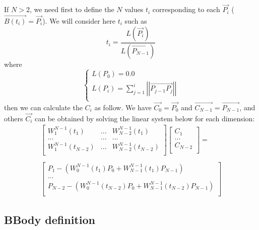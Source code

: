 If $N>2$, we need first to define the $N$ values $t_i$ corresponding to each $\overrightarrow{P_i}$ ($\overrightarrow{B(t_i)}=\overrightarrow{P_i}$). We will consider here $t_i$ such as\\
\begin{equation}
t_i=\frac{L(\overrightarrow{P_i})}{L(\overrightarrow{P_{N-1}})}
\end{equation}
where
\begin{equation}
\left\lbrace
\begin{array}{l}
L(P_0)=0.0\\
L(P_i)=\sum^i_{j=1}\left|\left|\overrightarrow{P_{j-1}P_j}\right|\right|\\
\end{array}
\right.
\end{equation}
then we can calculate the $C_i$ as follow. We have $\overrightarrow{C_0}=\overrightarrow{P_0}$ and $\overrightarrow{C_{N-1}}=\overrightarrow{P_{N-1}}$, and others $\overrightarrow{C_i}$ can be obtained by solving the linear system below for each dimension:\\
\begin{equation}
\begin{array}{c}
\left[
\begin{array}{ccc}
W^{N-1}_1(t_1)&...&W^{N-1}_{N-2}(t_1)\\
...&...&...\\
W^{N-1}_1(t_{N-2})&...&W^{N-1}_{N-2}(t_{N-2})\\
\end{array}
\right]\left[
\begin{array}{c}
C_1\\
...\\
C_{N-2}\\
\end{array}
\right]=\\
\\
\left[
\begin{array}{c}
P_1-\left(W^{N-1}_0(t_1)P_0+W^{N-1}_{N-1}(t_1)P_{N-1}\right)\\
...\\
P_{N-2}-\left(W^{N-1}_0(t_{N-2})P_0+W^{N-1}_{N-1}(t_{N-2})P_{N-1}\right)\\
\end{array}
\right]
\end{array}
\end{equation}

\subsection{BBody definition}

